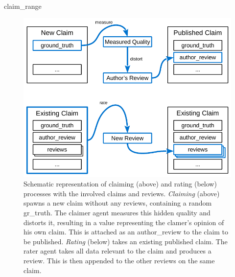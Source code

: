 \documentclass[%
    ]{\PathToTumTemplate/thesis/tum_thesis}
\begin{document}
\gls{claim_range}
\begin{figure}[]
  \begin{center}
        \includegraphics[width=1\linewidth]	{../images/claim_rate_process-crop.pdf}
    \caption{
    Schematic representation of claiming (above) and rating (below) processes with the involved claims and reviews.
	\emph{Claiming} (above) spawns a new claim without any reviews, containing a random \gls{gr_truth}.
	The claimer agent measures this hidden quality and distorts it, resulting in a value representing the clamer's opinion of his own claim.
	This is attached as an \gls{author_review} to the claim to be published.
	\emph{Rating} (below) takes an existing published claim.
	The rater agent takes all data relevant to the claim and produces a \gls{review}.
	This is then appended to the other reviews on the same claim.
    }
    \label{fig:claim_rate_process}
  \end{center}
\end{figure}
\end{document}
